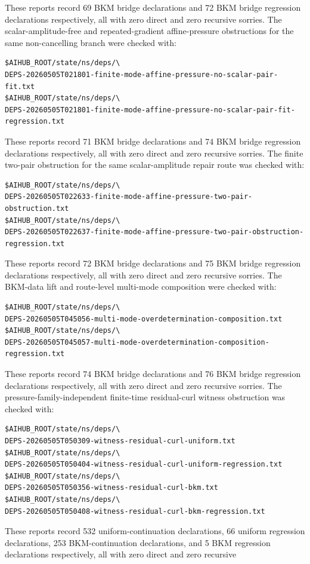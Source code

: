 \documentclass[11pt]{article}
\begin{document}
These reports record 69 BKM bridge declarations and 72 BKM bridge regression
declarations respectively, all with zero direct and zero recursive sorries.
The scalar-amplitude-free and repeated-gradient affine-pressure obstructions
for the same non-cancelling branch were checked with:
\begin{verbatim}
$AIHUB_ROOT/state/ns/deps/\
DEPS-20260505T021801-finite-mode-affine-pressure-no-scalar-pair-fit.txt
$AIHUB_ROOT/state/ns/deps/\
DEPS-20260505T021801-finite-mode-affine-pressure-no-scalar-pair-fit-regression.txt
\end{verbatim}
These reports record 71 BKM bridge declarations and 74 BKM bridge regression
declarations respectively, all with zero direct and zero recursive sorries.
The finite two-pair obstruction for the same scalar-amplitude repair route was
checked with:
\begin{verbatim}
$AIHUB_ROOT/state/ns/deps/\
DEPS-20260505T022633-finite-mode-affine-pressure-two-pair-obstruction.txt
$AIHUB_ROOT/state/ns/deps/\
DEPS-20260505T022637-finite-mode-affine-pressure-two-pair-obstruction-regression.txt
\end{verbatim}
These reports record 72 BKM bridge declarations and 75 BKM bridge regression
declarations respectively, all with zero direct and zero recursive sorries.
The BKM-data lift and route-level multi-mode composition were checked with:
\begin{verbatim}
$AIHUB_ROOT/state/ns/deps/\
DEPS-20260505T045056-multi-mode-overdetermination-composition.txt
$AIHUB_ROOT/state/ns/deps/\
DEPS-20260505T045057-multi-mode-overdetermination-composition-regression.txt
\end{verbatim}
These reports record 74 BKM bridge declarations and 76 BKM bridge regression
declarations respectively, all with zero direct and zero recursive sorries.
The pressure-family-independent finite-time residual-curl witness obstruction
was checked with:
\begin{verbatim}
$AIHUB_ROOT/state/ns/deps/\
DEPS-20260505T050309-witness-residual-curl-uniform.txt
$AIHUB_ROOT/state/ns/deps/\
DEPS-20260505T050404-witness-residual-curl-uniform-regression.txt
$AIHUB_ROOT/state/ns/deps/\
DEPS-20260505T050356-witness-residual-curl-bkm.txt
$AIHUB_ROOT/state/ns/deps/\
DEPS-20260505T050408-witness-residual-curl-bkm-regression.txt
\end{verbatim}
These reports record 532 uniform-continuation declarations, 66 uniform
regression declarations, 253 BKM-continuation declarations, and 5 BKM
regression declarations respectively, all with zero direct and zero recursive
\end{document}
